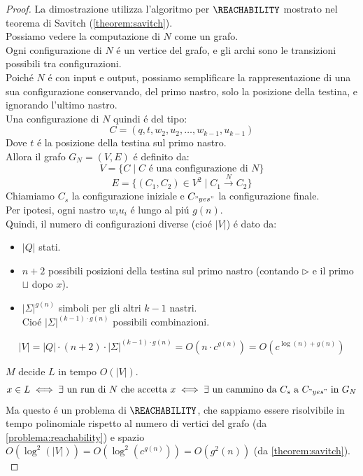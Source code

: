 \begin{proof}
La dimostrazione utilizza l'algoritmo per $\REACHABILITY$ mostrato nel teorema di Savitch (\ref{theorem:savitch}). \\
Possiamo vedere la computazione di $N$ come un grafo. \\
Ogni configurazione di $N$ é un vertice del grafo, 
e gli archi sono le transizioni possibili tra configurazioni. \\

Poiché $N$ é con input e output, 
possiamo semplificare la rappresentazione di una sua configurazione
conservando, del primo nastro, solo la posizione della testina,
e ignorando l'ultimo nastro. \\
Una configurazione di $N$ quindi é del tipo:
\[
C = (q, t, w_2, u_2, \dots, w_{k-1}, u_{k-1})
\]
Dove $t$ é la posizione della testina sul primo nastro. \\

Allora il grafo $G_N = (V, E)$ é definito da:
\[
V = \{C \mid C \text{ é una configurazione di } N\}
\]
\[
E = \{(C_1, C_2) \in V^2 \mid C_1 \xrightarrow{N} C_2\}
\]
Chiamiamo $C_s$ la configurazione iniziale e $C_{"yes"}$ la configurazione finale. \\

Per ipotesi, ogni nastro $w_i u_i$ é lungo al piú $g(n)$. \\
Quindi, il numero di configurazioni diverse (cioé $|V|$) é dato da:
\begin{itemize}
	\item $|Q|$ stati.
	\item $n+2$ possibili posizioni della testina sul primo nastro (contando $\triangleright$ e il primo $\sqcup$ dopo $x$).
	\item $|\Sigma|^{g(n)}$ simboli per gli altri $k-1$ nastri. \\ 
	Cioé $|\Sigma|^{(k-1) \cdot g(n)}$ possibili combinazioni. \\
\end{itemize}
\[
|V| = |Q| \cdot (n+2) \cdot |\Sigma|^{(k-1) \cdot g(n)} = O(n \cdot c^{g(n)}) = O(c^{\log(n) + g(n)})
\]

$M$ decide $L$ in tempo $O(|V|)$. \\
\[
x \in L \iff \exists \text{ un run di } N \text{ che accetta } x \iff \exists \text{ un cammino da } C_s \text{ a } C_{"yes"} \text{ in } G_N
\]
Ma questo é un problema di $\REACHABILITY$, che sappiamo essere risolvibile in tempo polinomiale rispetto al numero di vertici del grafo (da \ref{problema:reachability}) 
e spazio $O(\log^2(|V|)) = O(\log^2 (c^{g(n)})) = O(g^2(n))$ (da \ref{theorem:savitch}). \\


\end{proof}
